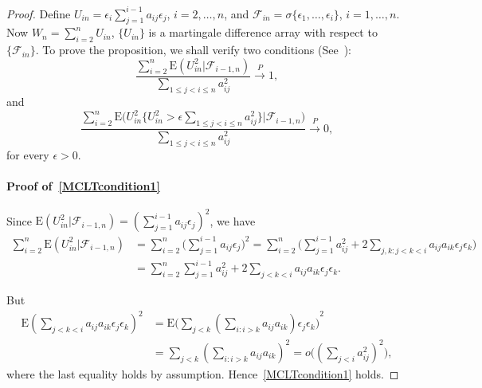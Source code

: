 \documentclass[review]{elsarticle}
\theoremstyle{plain}
\theoremstyle{definition}
\theoremstyle{remark}
\begin{document}
 \begin{proof}
     Define $U_{in} =\epsilon_i \sum_{j=1}^{i-1} a_{ij}\epsilon_j$, $i=2,\ldots,n$, and $\mathcal{F}_{in}=\sigma\{\epsilon_1,\ldots,\epsilon_i\}$, $i=1,\ldots, n$.
     Now $W_n=\sum_{i=2}^n U_{in}$, $\{U_{in}\}$ is a martingale difference array with respect to $\{\mathcal{F}_{in}\}$. 
     To prove the proposition, we shall verify two conditions (See~\cite{pollard1984convergence}):
     \begin{equation}\label{MCLTcondition1}
         \frac{\sum_{i=2}^n \mathrm{E}(U_{in}^2 |\mathcal{F}_{i-1,n})}{\sum_{1\leq j<i\leq n} a_{ij}^2}\xrightarrow{P} 1,
     \end{equation}
     and
     \begin{equation}\label{MCLTcondition2}
         \frac{\sum_{i=2}^n \mathrm{E}\big(U_{in}^2\big\{U_{in}^2>\epsilon \sum_{1\leq j<i\leq n} a_{ij}^2\big\}\big|\mathcal{F}_{i-1,n}\big)}{\sum_{1\leq j<i\leq n} a_{ij}^2}\xrightarrow{P} 0,
     \end{equation}
     for every $\epsilon>0$.

     \paragraph{Proof of~\eqref{MCLTcondition1}}
     Since $\mathrm{E}(U_{in}^2 |\mathcal{F}_{i-1,n})={(\sum_{j=1}^{i-1}a_{ij}\epsilon_j)}^2$, we have
     \begin{equation*}
         \begin{aligned}
\sum_{i=2}^n \mathrm{E}(U_{in}^2 |\mathcal{F}_{i-1,n})
             &=\sum_{i=2}^n \big(\sum_{j=1}^{i-1}a_{ij}\epsilon_j \big)^2
             =\sum_{i=2}^n \big( \sum_{j=1}^{i-1} a_{ij}^2 +2\sum_{j,k:j<k<i} a_{ij}a_{ik}\epsilon_j \epsilon_k \big)\\
             &=\sum_{i=2}^n  \sum_{j=1}^{i-1} a_{ij}^2 +2\sum_{j<k<i} a_{ij}a_{ik}\epsilon_j \epsilon_k.
         \end{aligned}
     \end{equation*}

     But
     \begin{equation*}
         \begin{aligned}
         \mathrm{E}{(\sum_{j<k<i} a_{ij}a_{ik}\epsilon_j \epsilon_k)}^2
             &=
             \mathrm{E}{\big(\sum_{j<k} (\sum_{i:i>k}a_{ij}a_{ik})\epsilon_j \epsilon_k \big)}^2\\
             &=
             \sum_{j<k} (\sum_{i:i>k}a_{ij}a_{ik})^2
             =
             o\big({(\sum_{j<i} a_{ij}^2)}^2\big),
         \end{aligned}
     \end{equation*}
     where the last equality holds by assumption. Hence~\eqref{MCLTcondition1} holds.

\end{proof}
\end{document}
